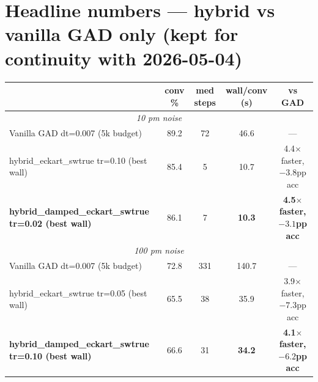 \documentclass[11pt]{article}
\begin{document}
\section*{Headline numbers --- hybrid vs vanilla GAD only (kept for continuity with 2026-05-04)}

\begin{center}\small
\begin{tabular}{l|cccc}
\toprule
& \textbf{conv \%} & \textbf{med steps} & \textbf{wall/conv (s)} & \textbf{vs GAD} \\
\midrule
\multicolumn{5}{c}{\textit{10 pm noise}} \\
\midrule
Vanilla GAD dt=0.007 (5k budget)                          & 89.2 & 72  & 46.6 & --- \\
hybrid\_eckart\_swtrue tr=0.10 (best wall)                & 85.4 & 5   & 10.7 & 4.4$\times$ faster, $-3.8$pp acc \\
\textbf{hybrid\_damped\_eckart\_swtrue tr=0.02 (best wall)} & 86.1 & 7   & \textbf{10.3} & \textbf{4.5$\times$ faster, $-3.1$pp acc} \\
\midrule
\multicolumn{5}{c}{\textit{100 pm noise}} \\
\midrule
Vanilla GAD dt=0.007 (5k budget)                          & 72.8 & 331 & 140.7 & --- \\
hybrid\_eckart\_swtrue tr=0.05 (best wall)                & 65.5 & 38  & 35.9 & 3.9$\times$ faster, $-7.3$pp acc \\
\textbf{hybrid\_damped\_eckart\_swtrue tr=0.10 (best wall)} & 66.6 & 31  & \textbf{34.2} & \textbf{4.1$\times$ faster, $-6.2$pp acc} \\
\bottomrule
\end{tabular}
\end{center}
\end{document}
